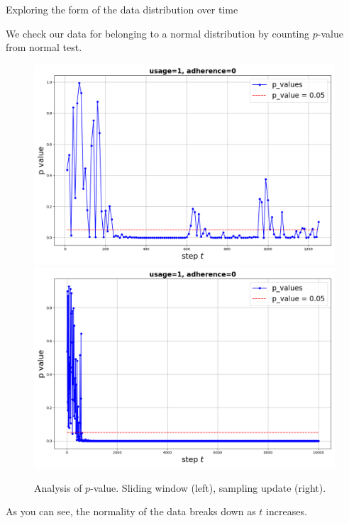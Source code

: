 \documentclass[aspectratio=169]{beamer}
\begin{document}
    \begin{frame}{Exploring the form of the data distribution over time}
        
        \small
        We check our data for belonging to a normal distribution by counting $p$-value from normal test. 
        
        \begin{figure}[h!]
            \centering
            \includegraphics[width=0.45\linewidth]{pictures/p_loop_1_0.png}
            \includegraphics[width=0.45\linewidth]{pictures/p_sample_1_0.png}
            
            \caption{Analysis of $p$-value. Sliding window (left), sampling update (right).}
            \label{p_value}
        \end{figure}

        As you can see, the normality of the data breaks down as $t$ increases.
    \end{frame}
    
\end{document}
